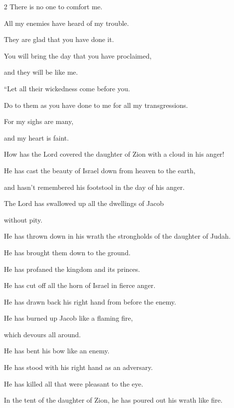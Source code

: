 \begin{multicols}{2}
	There is no one to comfort me.
	
	All my enemies have heard of my trouble.
	
	They are glad that you have done it.
	
	You will bring the day that you have proclaimed,
	
	and they will be like me.
	\vspace{\baselineskip}
	
	\myverse{}“Let all their wickedness come before you.
	
	Do to them as you have done to me for all my transgressions.
	
	For my sighs are many,
	
	and my heart is faint.
	
	
	\mychapter{} \myverse*{}How has the Lord covered the daughter of Zion with a cloud in his
	anger!
	
	He has cast the beauty of Israel down from heaven to the earth,
	
	and hasn’t remembered his footstool in the day of his anger.
	\vspace{\baselineskip}
	
	\myverse{}The Lord has swallowed up all the dwellings of Jacob
	
	without pity.
	
	He has thrown down in his wrath the strongholds of the daughter of Judah.
	
	He has brought them down to the ground.
	
	He has profaned the kingdom and its princes.
	\vspace{\baselineskip}
	
	\myverse{}He has cut off all the horn of Israel in fierce anger.
	
	He has drawn back his right hand from before the enemy.
	
	He has burned up Jacob like a flaming fire,
	
	which devours all around.
	\vspace{\baselineskip}
	
	\myverse{}He has bent his bow like an enemy.
	
	He has stood with his right hand as an adversary.
	
	He has killed all that were pleasant to the eye.
	
	In the tent of the daughter of Zion, he has poured out his wrath like fire.
	\vspace{\baselineskip}
	

\end{multicols}
